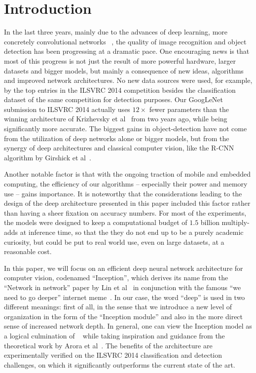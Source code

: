 \section{Introduction}

In the last three years, mainly due to the advances of deep learning, more concretely convolutional networks ~\cite{lecun1989backprop}, the quality of image recognition and object detection has been progressing at a dramatic pace. One encouraging news is that most of this progress is not just the result of more powerful hardware, larger datasets and bigger models, but mainly a consequence of new ideas, algorithms and improved network architectures. No new data sources were used, for example, by the top entries in the ILSVRC 2014 competition besides the classification dataset of the same competition for detection purposes. Our GoogLeNet submission to ILSVRC 2014 actually uses $12\times$ fewer parameters than the winning architecture of Krizhevsky et al~\cite{krizhevsky2012imagenet} from two years ago, while being significantly more accurate. The biggest gains in object-detection have not come from the utilization of deep networks alone or bigger models, but from the synergy of deep architectures and classical computer vision, like the R-CNN algorithm by Girshick et al~\cite{girshick2014rich}. 

Another notable factor is that with the ongoing traction of mobile and embedded computing, the efficiency of our algorithms -- especially their power and memory use -- gains importance. It is noteworthy that the considerations leading to the design of the deep architecture presented in this paper included this factor rather than having a sheer fixation on accuracy numbers. For most of the experiments, the models were designed to keep a computational budget of $1.5$ billion multiply-adds at inference time, so that the they do not end up to be a purely academic curiosity, but could be put to real world use, even on large datasets, at a reasonable cost.

In this paper, we will focus on an efficient deep neural network architecture for computer vision, codenamed “Inception”, which derives its name from the “Network in network” paper by Lin et al~\cite{lin2013nin} in conjunction with the famous ``we need to go deeper'' internet meme~\cite{knowyourmeme}. In our case, the word ``deep'' is used in two different meanings: first of all, in the sense that we introduce a new level of organization in the form of the ``Inception module'' and also in the more direct sense of increased network depth. In general, one can view the Inception model as a logical culmination of ~\cite{lin2013nin} while taking inspiration and guidance from the theoretical work by Arora et al~\cite{arora2013bounds}. The benefits of the architecture are experimentally verified on the ILSVRC 2014 classification and detection challenges, on which it significantly outperforms the current state of the art. 

